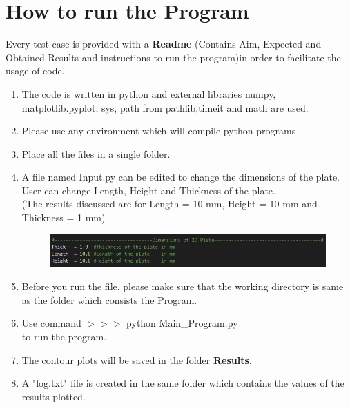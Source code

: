 \documentclass[11pt]{article}
\begin{document}
\section{How to run the Program}
	Every test case is provided with a
\textbf{Readme} (Contains Aim, Expected and Obtained Results and instructions to run the program)in order to facilitate the usage of code.
\begin{enumerate}[leftmargin=*]

	\item The code is written in python and external libraries numpy, matplotlib.pyplot, sys, path from pathlib,timeit and math are used.
	\item Please use any environment which will compile python programs
	\item Place all the files in a single folder.
	\item A file named Input.py can be edited to change the dimensions of the plate. User can change Length, Height and Thickness of the plate. \\(The results discussed are for Length = 10 mm, Height = 10 mm and Thickness = 1 mm)
	\begin{figure}[H]
		\begin{center}
			\includegraphics[scale=0.8]{Input.png} 
		\end{center}	
	\end{figure}
	\item Before you run the file, please make sure that the working directory is same as the folder  which
	consists the Program.
	\item Use command  $>>>$ python Main\_Program.py \\ to run the program.
	\item The contour plots will be saved in the folder \textbf{Results.}
	\item A "log.txt" file is created in the same folder which contains the values of the results plotted.
	
	
\end{enumerate}
\newpage
\end{document}
